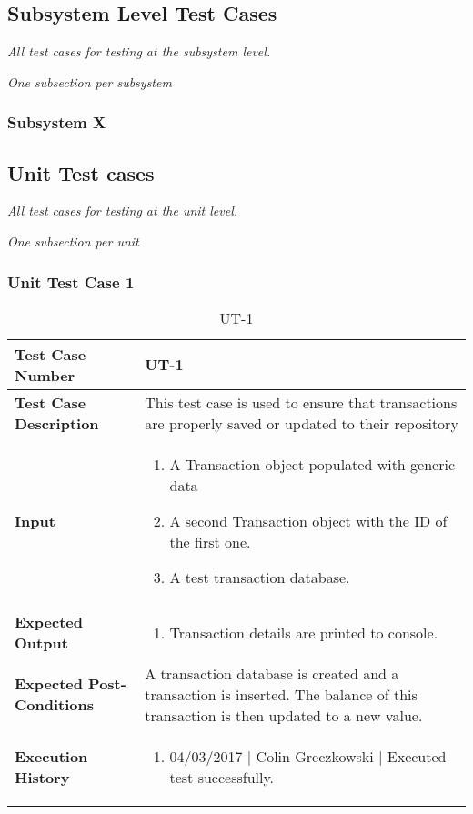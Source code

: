 \documentclass[12pt]{article}
\begin{document}
\subsection{Subsystem Level Test Cases}

{\it
All test cases for testing at the subsystem level.
}

{\it
One subsection per subsystem
}

\subsubsection{Subsystem X}

\subsection{Unit Test cases}

{\it
All test cases for testing at the unit level.
}

{\it
One subsection per unit
}


\subsubsection{Unit Test Case 1} \label{tc:1}
\begin{table}[htbp]
\centering
\caption {UT-1}
\label{UT-1}
\begin{tabularx}{\textwidth}{ | l | X |}
\hline
\textbf{Test Case Number}      &  UT-1                         \\ \hline
\textbf{Test Case Description}    &  This test case is used to ensure that transactions are properly saved or updated to their repository                \\ \hline
\textbf{Input}         & 	\begin{enumerate}
	\item A Transaction object populated with generic data
          \item A second Transaction object with the ID of the first one.
	\item A test transaction database.
\end{enumerate} \\ \hline

\textbf{Expected Output}     & \begin{enumerate}
	\item Transaction details are printed to console.
\end{enumerate} \\ \hline
\textbf{Expected Post-Conditions}           &  A transaction database is created and a transaction is inserted. The balance of this transaction is then updated to a new value.                   \\ \hline
\textbf{Execution History}   &  \begin{enumerate}
	\item 04/03/2017 | Colin Greczkowski | Executed test successfully.
\end {enumerate} \\ \hline
\end{tabularx}
\end{table}
\clearpage
\end{document}
